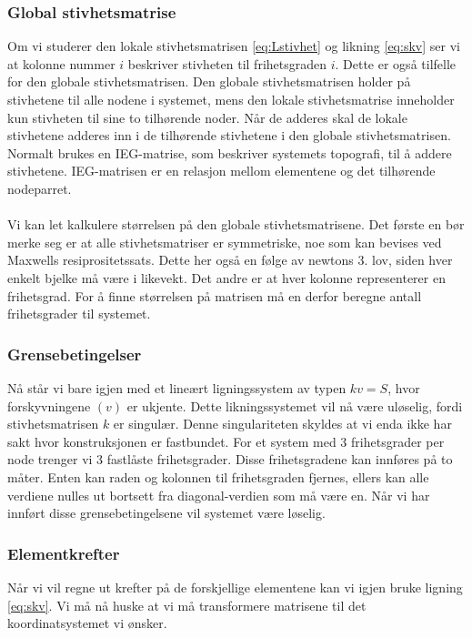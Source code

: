 \documentclass[10pt,a4paper, norsk]{article}
\begin{document}
\subsubsection{Global stivhetsmatrise}
Om vi studerer den lokale stivhetsmatrisen \ref{eq:Lstivhet} og likning \ref{eq:skv} ser vi at kolonne nummer $i$ beskriver stivheten til frihetsgraden $i$. Dette er også tilfelle for den globale stivhetsmatrisen. Den globale stivhetsmatrisen holder på stivhetene til alle nodene i systemet, mens den lokale stivhetsmatrise inneholder kun stivheten til sine to tilhørende noder. Når de adderes skal de lokale stivhetene adderes inn i de tilhørende stivhetene i den globale stivhetsmatrisen. Normalt brukes en IEG-matrise, som beskriver systemets topografi, til å addere stivhetene. IEG-matrisen er en relasjon mellom elementene og det tilhørende nodeparret.

\paragraph*{}
Vi kan let kalkulere størrelsen på den globale stivhetsmatrisene. Det første en bør merke seg er at alle stivhetsmatriser er symmetriske, noe som kan bevises ved Maxwells resiprositetssats. Dette her også en følge av newtons 3. lov, siden hver enkelt bjelke må være i likevekt. Det andre er at hver kolonne representerer en frihetsgrad. For å finne størrelsen på matrisen må en derfor beregne antall frihetsgrader til systemet.

\subsubsection{Grensebetingelser}
Nå står vi bare igjen med et lineært ligningssystem av typen $kv=S$, hvor forskyvningene $(v)$ er ukjente. Dette likningssystemet vil nå være uløselig, fordi stivhetsmatrisen $k$ er singulær. Denne singulariteten skyldes at vi enda ikke har sakt hvor konstruksjonen er fastbundet. For et system med 3 frihetsgrader per node trenger vi 3 fastlåste frihetsgrader. Disse frihetsgradene kan innføres på to måter. Enten kan raden og kolonnen til frihetsgraden fjernes, ellers kan alle verdiene nulles ut bortsett fra diagonal-verdien som må være en. Når vi har innført disse grensebetingelsene vil systemet være løselig.

\subsubsection{Elementkrefter}
Når vi vil regne ut krefter på de forskjellige elementene kan vi igjen bruke ligning \ref{eq:skv}. Vi må nå huske at vi må transformere matrisene til det koordinatsystemet vi ønsker. 
\end{document}
